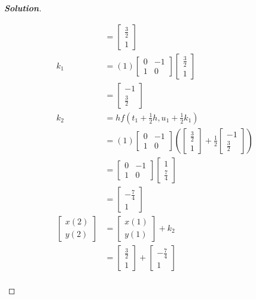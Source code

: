 \documentclass[11pt]{article}
\newenvironment{solution}{%
  \begin{proof}[\textbf{Solution}]$ $\par\nobreak\ignorespaces
}{%
  \end{proof}
}
\theoremstyle{definition}
\begin{document}
\begin{solution}
\begin{enumerate}[(a)]
\begin{align*}
    &= \begin{bmatrix*}\frac{3}{2} \\ 1\end{bmatrix*} \\
    k_1 &= (1)\begin{bmatrix*}0 & -1 \\ 1 & 0\end{bmatrix*}\begin{bmatrix*}\frac{3}{2} \\ 1\end{bmatrix*} \\
    &= \begin{bmatrix*}-1 \\ \frac{3}{2}\end{bmatrix*} \\
    k_2 &= hf\left(t_1 + \frac{1}{2}h, u_1 + \frac{1}{2}k_1\right) \\
    &= (1)\begin{bmatrix*}0 & -1 \\ 1 & 0\end{bmatrix*}\left(\begin{bmatrix*}\frac{3}{2} \\ 1\end{bmatrix*} + \frac{1}{2}\begin{bmatrix*}-1 \\ \frac{3}{2}\end{bmatrix*}\right) \\
    &= \begin{bmatrix*}0 & -1 \\ 1 & 0\end{bmatrix*}\begin{bmatrix*}1 \\ \frac{7}{4}\end{bmatrix*} \\
    &= \begin{bmatrix*}-\frac{7}{4} \\ 1\end{bmatrix*} \\
    \begin{bmatrix*}x(2) \\ y(2)\end{bmatrix*} &= \begin{bmatrix*}x(1) \\ y(1)\end{bmatrix*} + k_2 \\
    &= \begin{bmatrix*}\frac{3}{2} \\ 1\end{bmatrix*} + \begin{bmatrix*}-\frac{7}{4} \\ 1\end{bmatrix*} \\

\end{align*}
\end{enumerate}
\end{solution}
\end{document}
